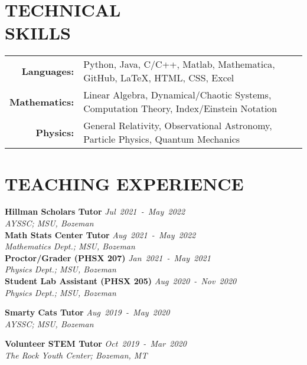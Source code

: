 \documentclass[margin]{res}
\begin{document}
\begin{resume}
\section{TECHNICAL\\SKILLS}

{
\begin{tabular}{r p{9.5cm}}
\textbf{Languages:}   & Python, Java, C/C++, Matlab, Mathematica, GitHub, LaTeX, HTML, CSS, Excel \vspace*{0.5ex}\\
\textbf{Mathematics:} & Linear Algebra, Dynamical/Chaotic Systems, Computation Theory, Index/Einstein Notation \vspace*{0.5ex} \\
\textbf{Physics:}     & General Relativity, Observational Astronomy, Particle Physics, Quantum Mechanics  \\
\end{tabular}
}





\section{TEACHING EXPERIENCE}
\textbf{Hillman Scholars Tutor}\hfill
{\sl Jul~2021~-~May~2022}\\
{\sl AYSSC; MSU, Bozeman}\vspace*{1ex}\\
\textbf{Math Stats Center Tutor}\hfill
{\sl Aug~2021~-~May~2022}\\
{\sl Mathematics Dept.; MSU, Bozeman}\vspace*{1ex}\\
\textbf{Proctor/Grader (PHSX 207)} \hfill 
{\sl Jan~2021~-~May~2021}\\
{\sl Physics Dept.; MSU, Bozeman}\vspace*{1ex}\\
\textbf{Student Lab Assistant (PHSX 205)}\hfill
{\sl Aug~2020~-~Nov~2020}\\
{\sl Physics Dept.; MSU, Bozeman}\vspace*{1ex}\\
\noindent
\raggedright
\textbf{Smarty Cats Tutor}\hfill
{\sl Aug~2019~-~May~2020}\\
{\sl AYSSC; MSU, Bozeman}\vspace*{1ex}\\
\noindent
\raggedright
\textbf{Volunteer STEM Tutor}\hfill
{\sl Oct~2019~-~Mar~2020}\\
{\sl The Rock Youth Center; Bozeman, MT}



\end{resume}
\end{document}
